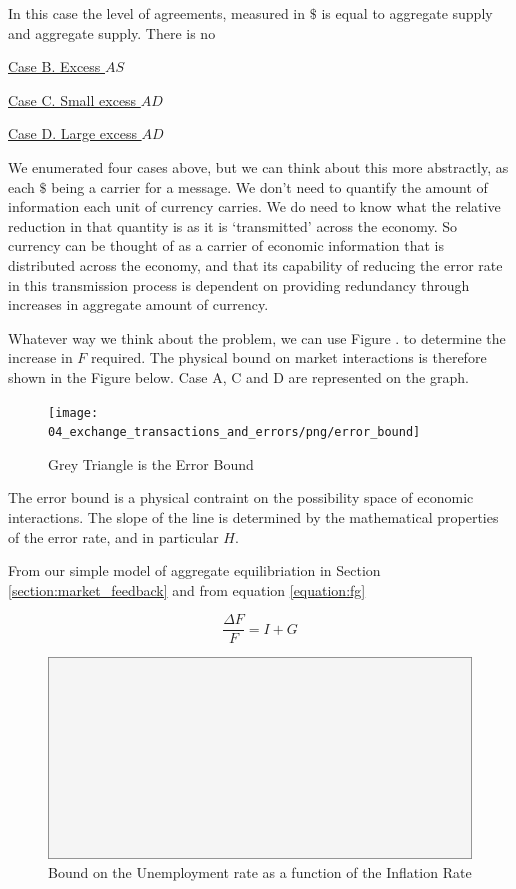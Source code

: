 In this case the level of agreements, measured in $\$$ is equal to aggregate supply and aggregate
supply. There is no  

\underline{Case B. Excess $AS$}

\underline{Case C. Small excess $AD$}

\underline{Case D. Large excess $AD$}

We enumerated four cases above, but we can think about this more abstractly, as each $\$$ being a
carrier for a message. We don't need to quantify the amount of information each unit of currency
carries. We do need to know what the relative reduction in that quantity is as it is `transmitted'
across the economy. So currency can be thought of as a carrier of economic information that is
distributed across the economy, and that its capability of reducing the error rate in this
transmission process is dependent on providing redundancy through increases in aggregate amount of
currency.

Whatever way we think about the problem, we can use Figure \label{fig:shannons_proof}. to determine the
increase in $F$ required. The physical bound on market interactions is therefore shown in the Figure
below. Case A, C and D are represented on the graph.

\begin{figure}[H]
\centering
\texttt{[image: 04\_exchange\_transactions\_and\_errors/png/error\_bound]}
\caption{Grey Triangle is the Error Bound}
\label{fig:error_bound}
\end{figure}

The error bound is a physical contraint on the possibility space of economic interactions. The slope
of the line is determined by the mathematical properties of the error rate, and in particular $H$.

From our simple model of aggregate equilibriation in Section \ref{section:market_feedback} and from
equation \ref{equation:fg}

\begin{equation}
    \frac {\Delta F} F = I + G
\end{equation}


\begin{figure}[H]
\centering
\includegraphics[scale=0.48]{blank}
\caption{Bound on the Unemployment rate as a function of the Inflation Rate}
\label{fig:ui_bound}
\end{figure}

